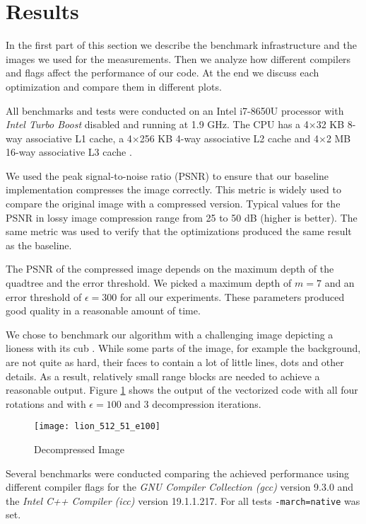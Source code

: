 \section{Results}\label{sec:exp}

In the first part of this section we describe the benchmark infrastructure and the
images we used for the measurements. Then we analyze how different compilers and flags  
affect the performance of our code. At the end we discuss each optimization and compare
them in different plots.

 All benchmarks and tests were conducted on an Intel
i7-8650U processor with \textit{Intel Turbo Boost} disabled and running at 1.9
GHz. The CPU has a 4$\times$32 KB 8-way associative L1 cache, a 4$\times$256 KB
4-way associative L2 cache and 4$\times$2 MB 16-way associative L3 cache
\cite{intel-opt-manual}. 

We used the peak signal-to-noise ratio (PSNR) to ensure that our baseline implementation
compresses the image correctly. This metric is widely used to compare the original image with
a compressed version. Typical values for the PSNR in lossy image compression range from 25 to 
50 dB (higher is better). The same metric was used to verify that the optimizations 
produced the same result as the baseline.

The PSNR of the compressed image depends on the maximum depth of the quadtree and the error
threshold. We picked a maximum depth of $m=7$ and an error threshold of $\epsilon=300$ for
all our experiments. These parameters produced good quality in a reasonable amount of time.

We chose to benchmark our algorithm with a challenging image depicting a lioness
with its cub \cite{lions}. While some parts of the image, for example the
background, are not quite as hard, their faces to contain a lot of little lines,
dots and other details. As a result, relatively small range blocks are needed to
achieve a reasonable output. Figure \ref{fig:lions} shows the output of the
vectorized code with all four rotations and with $\epsilon=100$ and 3
decompression iterations.

\begin{figure}
  \centering
  \texttt{[image: lion\_512\_51\_e100]}
  \caption{Decompressed Image}
  \label{fig:lions}
\end{figure}

 Several benchmarks were conducted comparing the achieved
performance using different compiler flags for the \textit{GNU Compiler
  Collection (gcc)} version 9.3.0 and the \textit{Intel C++ Compiler (icc)}
version 19.1.1.217. For all tests \texttt{-march=native} was set.

